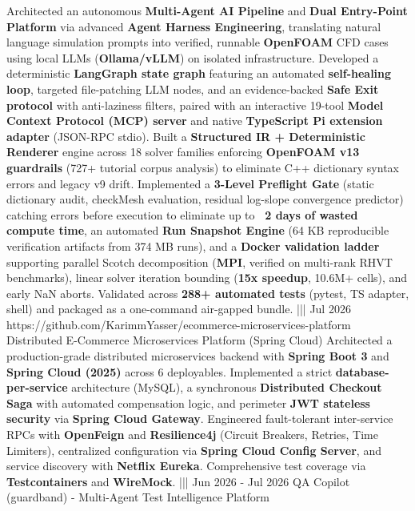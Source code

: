 {    {Architected an autonomous \textbf{Multi-Agent AI Pipeline} and \textbf{Dual Entry-Point Platform} via advanced \textbf{Agent Harness Engineering}, translating natural language simulation prompts into verified, runnable \textbf{OpenFOAM} CFD cases using local LLMs (\textbf{Ollama/vLLM}) on isolated infrastructure. Developed a deterministic \textbf{LangGraph state graph} featuring an automated \textbf{self-healing loop}, targeted file-patching LLM nodes, and an evidence-backed \textbf{Safe Exit protocol} with anti-laziness filters, paired with an interactive 19-tool \textbf{Model Context Protocol (MCP) server} and native \textbf{TypeScript Pi extension adapter} (JSON-RPC stdio). Built a \textbf{Structured IR + Deterministic Renderer} engine across 18 solver families enforcing \textbf{OpenFOAM v13 guardrails} (727+ tutorial corpus analysis) to eliminate C++ dictionary syntax errors and legacy v9 drift. Implemented a \textbf{3-Level Preflight Gate} (static dictionary audit, checkMesh evaluation, residual log-slope convergence predictor) catching errors before execution to eliminate up to \textbf{~2 days of wasted compute time}, an automated \textbf{Run Snapshot Engine} (64 KB reproducible verification artifacts from 374 MB runs), and a \textbf{Docker validation ladder} supporting parallel Scotch decomposition (\textbf{MPI}, verified on multi-rank RHVT benchmarks), linear solver iteration bounding (\textbf{15x speedup}, 10.6M+ cells), and early NaN aborts. Validated across \textbf{288+ automated tests} (pytest, TS adapter, shell) and packaged as a one-command air-gapped bundle.}%
    |||
    {Jul 2026}%
    {https://github.com/KarimmYasser/ecommerce-microservices-platform}%
    {Distributed E-Commerce Microservices Platform (Spring Cloud)}%
    {Architected a production-grade distributed microservices backend with \textbf{Spring Boot 3} and \textbf{Spring Cloud (2025)} across 6 deployables. Implemented a strict \textbf{database-per-service} architecture (MySQL), a synchronous \textbf{Distributed Checkout Saga} with automated compensation logic, and perimeter \textbf{JWT stateless security} via \textbf{Spring Cloud Gateway}. Engineered fault-tolerant inter-service RPCs with \textbf{OpenFeign} and \textbf{Resilience4j} (Circuit Breakers, Retries, Time Limiters), centralized configuration via \textbf{Spring Cloud Config Server}, and service discovery with \textbf{Netflix Eureka}. Comprehensive test coverage via \textbf{Testcontainers} and \textbf{WireMock}.}%
    |||
    {Jun 2026 - Jul 2026}%
    {}%
    {QA Copilot (guardband) - Multi-Agent Test Intelligence Platform}%
}
